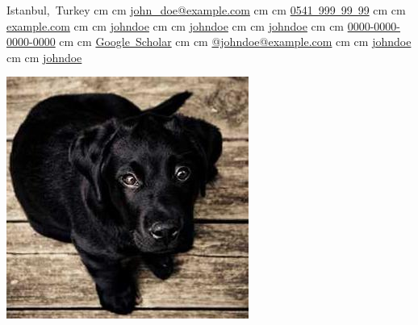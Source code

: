 \documentclass[10pt, letterpaper]{article}
\newenvironment{header}{
    \setlength{\topsep}{0pt}\par\kern\topsep\centering\linespread{1.5}
}{
    \par\kern\topsep
} %
\newenvironment{twocolheadercontainer}[2][]{
    \onecolentry
    \def\secondColumn{#2}
    \setcolumnwidth{\fill, 0.2\linewidth}
    \begin{paracol}{2}
}{
    \switchcolumn \raggedleft \secondColumn
    \end{paracol}
    \endonecolentry
} %
\let\hrefWithoutArrow\href
\renewcommand{\href}[2]{\hrefWithoutArrow{#1}{\ifthenelse{\equal{#2}{}}{ }{#2 }\raisebox{.15ex}{\footnotesize \faExternalLink*}}}
\begin{document}
\begin{twocolheadercontainer}{
        \includegraphics[width=\linewidth]{profile_picture.png}

    }
\begin{header}
        \normalsize
        \mbox{{\color{black}\footnotesize\faMapMarker*}\hspace*{0.13cm}Istanbul, Turkey}%
         cm%
        \AND%
         cm%
        \mbox{\hrefWithoutArrow{mailto:john_doe@example.com}{\color{black}{\footnotesize\faEnvelope[regular]}\hspace*{0.13cm}john\_doe@example.com}}%
         cm%
        \AND%
         cm%
        \mbox{\hrefWithoutArrow{tel:+90-541-999-99-99}{\color{black}{\footnotesize\faPhone*}\hspace*{0.13cm}0541 999 99 99}}%
         cm%
        \AND%
         cm%
        \mbox{\hrefWithoutArrow{https://example.com/}{\color{black}{\footnotesize\faLink}\hspace*{0.13cm}example.com}}%
         cm%
        \AND%
         cm%
        \mbox{\hrefWithoutArrow{https://linkedin.com/in/johndoe}{\color{black}{\footnotesize\faLinkedinIn}\hspace*{0.13cm}johndoe}}%
         cm%
        \AND%
         cm%
        \mbox{\hrefWithoutArrow{https://github.com/johndoe}{\color{black}{\footnotesize\faGithub}\hspace*{0.13cm}johndoe}}%
         cm%
        \AND%
         cm%
        \mbox{\hrefWithoutArrow{https://instagram.com/johndoe}{\color{black}{\footnotesize\faInstagram}\hspace*{0.13cm}johndoe}}%
         cm%
        \AND%
         cm%
        \mbox{\hrefWithoutArrow{https://orcid.org/0000-0000-0000-0000}{\color{black}{\footnotesize\faOrcid}\hspace*{0.13cm}0000-0000-0000-0000}}%
         cm%
        \AND%
         cm%
        \mbox{\hrefWithoutArrow{https://scholar.google.com/citations?user=F8IyYrQAAAAJ}{\color{black}{\footnotesize\faGraduationCap}\hspace*{0.13cm}Google Scholar}}%
         cm%
        \AND%
         cm%
        \mbox{\hrefWithoutArrow{https://example.com/@johndoe}{\color{black}{\footnotesize\faMastodon}\hspace*{0.13cm}@johndoe@example.com}}%
         cm%
        \AND%
         cm%
        \mbox{\hrefWithoutArrow{https://stackoverflow.com/users/12323/johndoe}{\color{black}{\footnotesize\faStackOverflow}\hspace*{0.13cm}johndoe}}%
         cm%
        \AND%
         cm%
        \mbox{\hrefWithoutArrow{https://gitlab.com/johndoe}{\color{black}{\footnotesize\faGitlab}\hspace*{0.13cm}johndoe}}%

\end{header}
\end{twocolheadercontainer}
\end{document}
